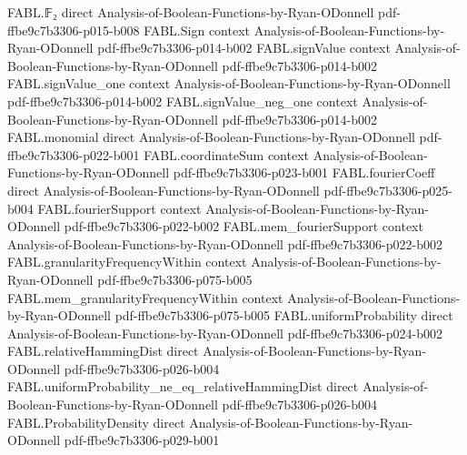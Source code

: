 \begin{theorem}
\label{FABL.localCorrection_successProbability}
\leanok
{}
\proofstep
  {FABL.𝔽₂}
  {direct}
  {Analysis-of-Boolean-Functions-by-Ryan-ODonnell}
  {pdf-ffbe9c7b3306-p015-b008}
\proofstep
  {FABL.Sign}
  {context}
  {Analysis-of-Boolean-Functions-by-Ryan-ODonnell}
  {pdf-ffbe9c7b3306-p014-b002}
\proofstep
  {FABL.signValue}
  {context}
  {Analysis-of-Boolean-Functions-by-Ryan-ODonnell}
  {pdf-ffbe9c7b3306-p014-b002}
\proofstep
  {FABL.signValue_one}
  {context}
  {Analysis-of-Boolean-Functions-by-Ryan-ODonnell}
  {pdf-ffbe9c7b3306-p014-b002}
\proofstep
  {FABL.signValue_neg_one}
  {context}
  {Analysis-of-Boolean-Functions-by-Ryan-ODonnell}
  {pdf-ffbe9c7b3306-p014-b002}
\proofstep
  {FABL.monomial}
  {direct}
  {Analysis-of-Boolean-Functions-by-Ryan-ODonnell}
  {pdf-ffbe9c7b3306-p022-b001}
\proofstep
  {FABL.coordinateSum}
  {context}
  {Analysis-of-Boolean-Functions-by-Ryan-ODonnell}
  {pdf-ffbe9c7b3306-p023-b001}
\proofstep
  {FABL.fourierCoeff}
  {direct}
  {Analysis-of-Boolean-Functions-by-Ryan-ODonnell}
  {pdf-ffbe9c7b3306-p025-b004}
\proofstep
  {FABL.fourierSupport}
  {context}
  {Analysis-of-Boolean-Functions-by-Ryan-ODonnell}
  {pdf-ffbe9c7b3306-p022-b002}
\proofstep
  {FABL.mem_fourierSupport}
  {context}
  {Analysis-of-Boolean-Functions-by-Ryan-ODonnell}
  {pdf-ffbe9c7b3306-p022-b002}
\proofstep
  {FABL.granularityFrequencyWithin}
  {context}
  {Analysis-of-Boolean-Functions-by-Ryan-ODonnell}
  {pdf-ffbe9c7b3306-p075-b005}
\proofstep
  {FABL.mem_granularityFrequencyWithin}
  {context}
  {Analysis-of-Boolean-Functions-by-Ryan-ODonnell}
  {pdf-ffbe9c7b3306-p075-b005}
\proofstep
  {FABL.uniformProbability}
  {direct}
  {Analysis-of-Boolean-Functions-by-Ryan-ODonnell}
  {pdf-ffbe9c7b3306-p024-b002}
\proofstep
  {FABL.relativeHammingDist}
  {direct}
  {Analysis-of-Boolean-Functions-by-Ryan-ODonnell}
  {pdf-ffbe9c7b3306-p026-b004}
\proofstep
  {FABL.uniformProbability_ne_eq_relativeHammingDist}
  {direct}
  {Analysis-of-Boolean-Functions-by-Ryan-ODonnell}
  {pdf-ffbe9c7b3306-p026-b004}
\proofstep
  {FABL.ProbabilityDensity}
  {direct}
  {Analysis-of-Boolean-Functions-by-Ryan-ODonnell}
  {pdf-ffbe9c7b3306-p029-b001}
\proofstep

\end{theorem}
